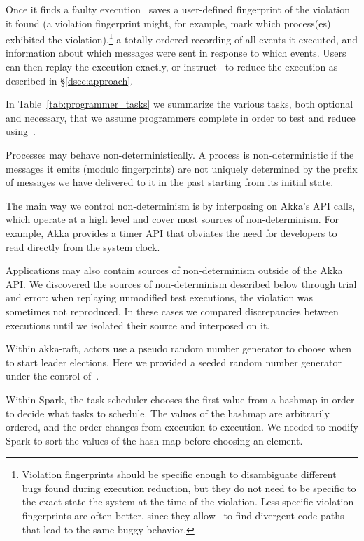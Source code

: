 Once it finds a faulty execution \sys~saves a user-defined fingerprint of the violation it
found (a violation fingerprint might, for example, mark which process(es)
exhibited the violation),\footnote{Violation fingerprints should
be specific enough to disambiguate different bugs found during execution
reduction, but they do not need to be specific to
the exact state the system at the time of the violation. Less
specific violation fingerprints are often better, since they allow \sys~to
find divergent code paths that lead to the same buggy behavior.}
a totally ordered recording of all events it
executed, and information about which messages were sent in
response to which events. Users can then replay the execution exactly, or
instruct \sys~to reduce the execution as described in \S\ref{dsec:approach}.

In Table~\ref{tab:programmer_tasks} we summarize the various tasks, both
optional and necessary, that we assume programmers
complete in order to test and reduce using~\sys.

 Processes may behave non-deterministically.
A process is non-deterministic if the messages it emits
(modulo fingerprints) are not uniquely determined by the prefix of messages we have
delivered to it in the past starting from its initial state.

The main way we control non-determinism is by interposing on Akka's API calls,
which operate at a high level and cover most sources of non-determinism.
For example, Akka provides a timer API that
obviates the need for developers to read directly from the system clock.

Applications may also contain sources of non-determinism outside of the Akka
API. We discovered the sources of non-determinism described below through trial and
error: when replaying unmodified test executions, the violation was sometimes not
reproduced. In these cases we compared discrepancies between executions until we
isolated their source and interposed on it.

 Within akka-raft, actors use a
pseudo random number generator to choose when to
start leader elections. Here we provided a seeded random
number generator under the control of~\sys.

 Within Spark, the task scheduler chooses the first value from a hashmap in order
to decide what tasks to schedule. The values of the hashmap are
arbitrarily ordered, and the order changes from execution to execution. We needed to modify
Spark to sort the values of the hash map before choosing an element.

